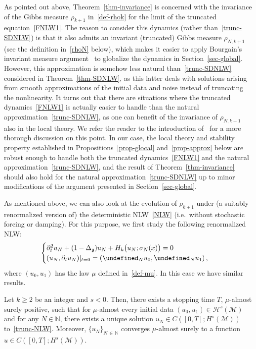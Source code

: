 \documentclass[AHL,Unicode,longabstracts,published]{cedram}
\newcommand{\N}{\mathbb{N}}
\let\P= \undefined
\newcommand{\P}{\mathbf{P}}
\newcommand{\M}{\mathcal{M}}
\renewcommand{\H}{\mathcal{H}}
\newcommand{\g}{\mathfrak{g}}
\newcommand{\Dlg}{\Delta_{\g}}
\newcommand{\s}{\sigma}
\newcommand{\dt}{\partial_t}
\begin{document}
\begin{rema}\label{REM:tronc}
As pointed out above, Theorem~\ref{thm-invariance} is concerned with the invariance of the Gibbs measure $\rho_{k+1}$ in~\eqref{def-rhok} for the limit of the truncated equation~\eqref{FNLW1}. The reason to consider this dynamics (rather than~\eqref{trunc-SDNLW}) is that it also admits an invariant (truncated) Gibbs measure $\rho_{N,k+1}$ (see the definition in~\eqref{rhoN} below), which makes it easier to apply Bourgain's invariant measure argument~\cite{BO94,BO96} to globalize the dynamics in Section~\ref{sec-global}. However, this approximation is somehow less natural than~\eqref{trunc-SDNLW} considered in Theorem~\ref{thm-SDNLW}, as this latter deals with solutions arising from smooth approximations of the initial data and noise instead of truncating the nonlinearity. It turns out that there are situations where the truncated dynamics~\eqref{FNLW1} is actually easier to handle than the natural approximation~\eqref{trunc-SDNLW}, as one can benefit of the invariance of $\rho_{N,k+1}$ also in the local theory. We refer the reader to the introduction of~\cite{STz} for a more thorough discussion on this point. In our case, the local theory and stability property established in Propositions~\ref{prop-glocal} and~\ref{prop-approx} below are robust enough to handle both the truncated dynamics~\eqref{FNLW1} and the natural approximation~\eqref{trunc-SDNLW}, and the result of Theorem~\ref{thm-invariance} should also hold for the natural approximation~\eqref{trunc-SDNLW} up to minor modifications of the argument presented in Section~\ref{sec-global}.
\end{rema}

As mentioned above, we can also look at the evolution of $\rho_{k+1}$ under (a suitably renormalized version of) the deterministic NLW~\eqref{NLW} (i.e.~without stochastic forcing or damping). For this purpose, we first study the following renormalized NLW:
\begin{equation}\label{trunc-NLW}
\begin{cases}
\dt^2 u_N + (1- \Dlg) u_N + H_k\big(u_N;\s_N(x)\big) = 0 \\
(u_N,\dt u_N)|_{t=0}=\left(\P_Nu_0,\P_Nu_1\right),
\end{cases}
\end{equation}
where $(u_0,u_1)$ has the law $\mu$ defined in~\eqref{def-mu}. In this case we have similar results.

\begin{theo}\label{THM:LWP}
Let $k \geq 2$ be an integer and $s<0$. Then, there exists a stopping time $T$, $\mu$-almost surely positive, such that for $\mu$-almost every initial data $(u_0,u_1)\in\H^s(\M)$ and for any $N\in \N$, there exists a unique solution $u_N \in C([0,T];H^{s}(\M))$ to~\eqref{trunc-NLW}. Moreover, $\{u_N\}_{N\,\in\,\N}$ converges $\mu$-almost surely to a function $u\in C([0,T];H^{s}(\M))$.
\end{theo}
\end{document}
